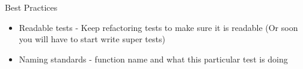 \begin{frame}[fragile]{Best Practices}
    \begin{itemize}
        \item Readable tests - Keep refactoring tests to make sure it is readable (Or soon you will have to start write super tests)
        \item Naming standards - function name and what this particular test is doing
    \end{itemize}
\end{frame}